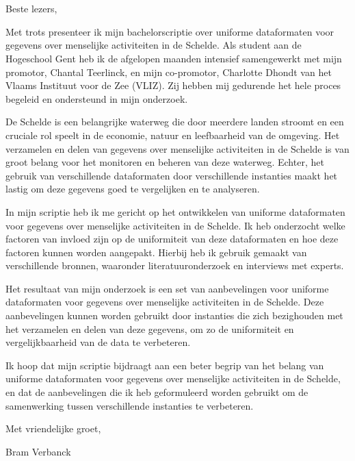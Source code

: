 
\chapter*{}%
\label{ch:voorwoord}


Beste lezers,

Met trots presenteer ik mijn bachelorscriptie over uniforme dataformaten voor gegevens over menselijke activiteiten in de Schelde. Als student aan de Hogeschool Gent heb ik de afgelopen maanden intensief samengewerkt met mijn promotor, Chantal Teerlinck, en mijn co-promotor, Charlotte Dhondt van het Vlaams Instituut voor de Zee (VLIZ). Zij hebben mij gedurende het hele proces begeleid en ondersteund in mijn onderzoek.

De Schelde is een belangrijke waterweg die door meerdere landen stroomt en een cruciale rol speelt in de economie, natuur en leefbaarheid van de omgeving. Het verzamelen en delen van gegevens over menselijke activiteiten in de Schelde is van groot belang voor het monitoren en beheren van deze waterweg. Echter, het gebruik van verschillende dataformaten door verschillende instanties maakt het lastig om deze gegevens goed te vergelijken en te analyseren.

In mijn scriptie heb ik me gericht op het ontwikkelen van uniforme dataformaten voor gegevens over menselijke activiteiten in de Schelde. Ik heb onderzocht welke factoren van invloed zijn op de uniformiteit van deze dataformaten en hoe deze factoren kunnen worden aangepakt. Hierbij heb ik gebruik gemaakt van verschillende bronnen, waaronder literatuuronderzoek en interviews met experts.

Het resultaat van mijn onderzoek is een set van aanbevelingen voor uniforme dataformaten voor gegevens over menselijke activiteiten in de Schelde. Deze aanbevelingen kunnen worden gebruikt door instanties die zich bezighouden met het verzamelen en delen van deze gegevens, om zo de uniformiteit en vergelijkbaarheid van de data te verbeteren.

Ik hoop dat mijn scriptie bijdraagt aan een beter begrip van het belang van uniforme dataformaten voor gegevens over menselijke activiteiten in de Schelde, en dat de aanbevelingen die ik heb geformuleerd worden gebruikt om de samenwerking tussen verschillende instanties te verbeteren.

Met vriendelijke groet,

Bram Verbanck